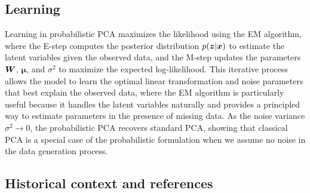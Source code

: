 \subsection{Learning}

Learning in probabilistic PCA maximizes the likelihood using the EM algorithm, where the E-step computes the posterior distribution $p(\boldsymbol{z}|\boldsymbol{x})$ to estimate the latent variables given the observed data, and the M-step updates the parameters $\boldsymbol{W}$, $\boldsymbol{\mu}$, and $\sigma^2$ to maximize the expected log-likelihood. This iterative process allows the model to learn the optimal linear transformation and noise parameters that best explain the observed data, where the EM algorithm is particularly useful because it handles the latent variables naturally and provides a principled way to estimate parameters in the presence of missing data. As the noise variance $\sigma^2 \to 0$, the probabilistic PCA recovers standard PCA, showing that classical PCA is a special case of the probabilistic formulation when we assume no noise in the data generation process.



\subsection{Historical context and references}

